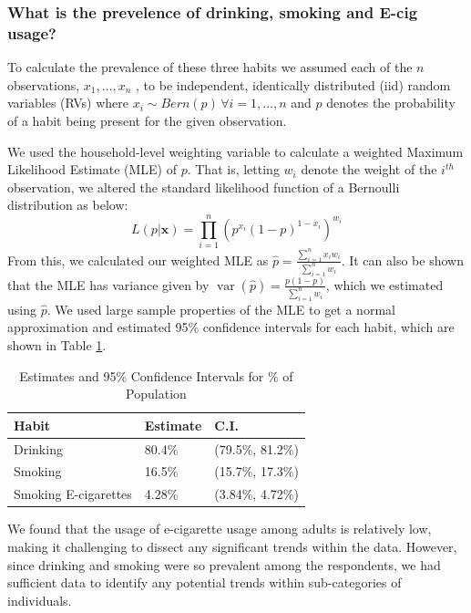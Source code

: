 \documentclass[
  11pt,
  twocolumn]{article}
\begin{document}
\subsubsection{What is the prevelence of drinking, smoking and E-cig
usage?}\label{what-is-the-prevelence-of-drinking-smoking-and-e-cig-usage}

To calculate the prevalence of these three habits we assumed each of the
\(n\) observations, \(x_1,…,x_n\) , to be independent, identically
distributed (iid) random variables (RVs) where
\(x_i \sim Bern(p)\, \forall i=1,…,n\) and \(p\) denotes the probability
of a habit being present for the given observation.

We used the household-level weighting variable to calculate a weighted
Maximum Likelihood Estimate (MLE) of \(p\). That is, letting \(w_i\)
denote the weight of the \(i^{th}\) observation, we altered the standard
likelihood function of a Bernoulli distribution as below:
\[L(p|\textbf{x}) = \prod_{i = 1}^{n} (p^{x_i}(1-p)^{1-x_i})^{w_i}\]
From this, we calculated our weighted MLE as
\(\widehat{p} = \frac{\sum_{i=1}^{n} x_iw_i}{\sum_{i=1}^{n} w_i}\). It
can also be shown that the MLE has variance given by
\(\mathop{\mathrm{var}}(\widehat{p})=\frac{p(1-p)}{\sum_{i=1}^{n}w_i}\),
which we estimated using \(\widehat{p}\). We used large sample
properties of the MLE to get a normal approximation and estimated 95\%
confidence intervals for each habit, which are shown in Table
\ref{tab:output-estimates-table}.

\begin{table}
\centering
\caption{\label{tab:outputestimatestable}Estimates and 95\% Confidence Intervals for \% of Population\label{tab:output-estimates-table}}
\centering
\fontsize{9}{11}\selectfont
\begin{tabular}[t]{l|l|l}
\hline
\textbf{Habit} & \textbf{Estimate} & \textbf{C.I.}\\
\hline
Drinking & 80.4\% & (79.5\%, 81.2\%)\\
\hline
Smoking & 16.5\% & (15.7\%, 17.3\%)\\
\hline
Smoking E-cigarettes & 4.28\% & (3.84\%, 4.72\%)\\
\hline
\end{tabular}
\end{table}

We found that the usage of e-cigarette usage among adults is relatively
low, making it challenging to dissect any significant trends within the
data. However, since drinking and smoking were so prevalent among the
respondents, we had sufficient data to identify any potential trends
within sub-categories of individuals.
\end{document}
